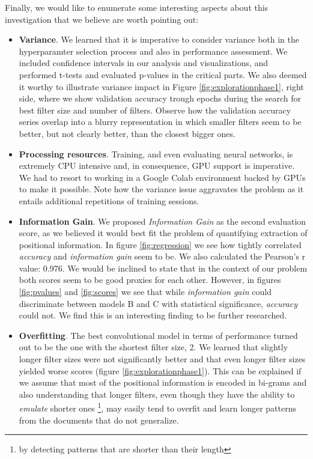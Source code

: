 \documentclass[10pt,journal,compsoc, onecolumn]{IEEEtran}
\begin{document}
Finally, we would like to enumerate some interesting aspects about this investigation that we believe are worth pointing out:
\begin{itemize}
    \item \textbf{Variance}. We learned that it is imperative to consider variance both in the hyperparamter selection process and also in performance assessment. We included confidence intervals in our analysis and visualizations, and performed t-tests and evaluated p-values in the critical parts. We also deemed it worthy to illustrate variance impact in Figure \ref{fig:explorationphase1}, right side, where we show validation accuracy trough epochs during the search for best filter size and number of filters. Observe how the validation accuracy series overlap into a blurry representation in which smaller filters seem to be better, but not clearly better, than the closest bigger ones.
    \item \textbf{Processing resources}. Training, and even evaluating neural networks, is extremely CPU intensive and, in consequence, GPU support is imperative. We had to resort to working in a Google Colab environment backed by GPUs to make it possible. Note how the variance issue aggravates the problem as it entails additional repetitions of training sessions.
    \item \textbf{Information Gain}. We proposed \textit{Information Gain} as the second evaluation score, as we believed it would best fit the problem of quantifying extraction of positional information. In figure \ref{fig:regression} we see how tightly correlated \textit{accuracy} and \textit{information gain} seem to be. We also calculated the Pearson's r value: 0.976. We would be inclined to state that in the context of our problem both scores seem to be good proxies for each other. However, in figures \ref{fig:pvalues} and \ref{fig:scores} we see that while \textit{information gain} could discriminate between models B and C with statistical significance, \textit{accuracy} could not. We find this is an interesting finding to be further researched.
    \item \textbf{Overfitting}. The best convolutional model in terms of performance turned out to be the one with the shortest filter size, 2. We learned that slightly longer filter sizes were not significantly  better and that even longer filter sizes yielded worse scores (figure \ref{fig:explorationphase1}). This can be explained if we assume that most of the positional information is encoded in bi-grams and also understanding that longer filters, even though they have the ability to \textit{emulate} shorter ones \footnote{by detecting patterns that are shorter than their length}, may easily tend to overfit and learn longer patterns from the documents that do not generalize.
\end{itemize}
\end{document}
